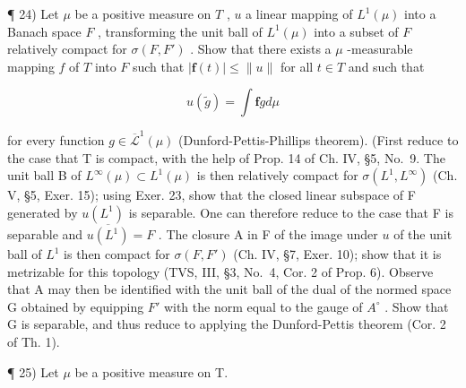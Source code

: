 ¶ 24) Let \(\mu\) be a positive measure on \(T\) , \(u\) a linear mapping of \(L^1(\mu)\) into a Banach space \(F\) , transforming the unit ball of \(L^1(\mu)\) into a subset of \(F\) relatively compact for \(\sigma(F, F')\) . Show that there exists a \(\mu\) -measurable mapping \(f\) of \(T\) into \(F\) such that \(|\mathbf{f}(t)| \leqslant \|u\|\) for all \(t \in T\) and such that

\[
u (\widetilde {g}) = \int \mathbf {f} g d \mu
\]

for every function \(g \in \overline{\mathcal{L}}^1(\mu)\) (Dunford-Pettis-Phillips theorem). (First reduce to the case that T is compact, with the help of Prop. 14 of Ch. IV, §5, No.~9. The unit ball B of \(L^\infty(\mu) \subset L^1(\mu)\) is then relatively compact for \(\sigma(L^1, L^\infty)\) (Ch. V, §5, Exer. 15); using Exer. 23, show that the closed linear subspace of F generated by \(u(L^1)\) is separable. One can therefore reduce to the case that F is separable and \(\overline{u(L^1)} = F\) . The closure A in F of the image under \(u\) of the unit ball of \(L^1\) is then compact for \(\sigma(F, F')\) (Ch. IV, §7, Exer. 10); show that it is metrizable for this topology (TVS, III, §3, No.~4, Cor. 2 of Prop. 6). Observe that A may then be identified with the unit ball of the dual of the normed space G obtained by equipping \(F'\) with the norm equal to the gauge of \(A^\circ\) . Show that G is separable, and thus reduce to applying the Dunford-Pettis theorem (Cor. 2 of Th. 1).

¶ 25) Let \(\mu\) be a positive measure on T.

